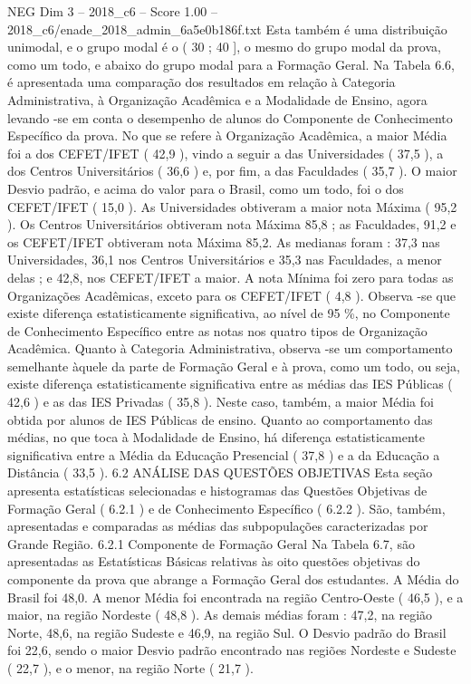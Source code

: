 \begin{textsample}{NEG Dim 3 – 2018\_c6 – Score 1.00 – 2018\_c6/enade\_2018\_admin\_6a5e0b186f.txt}
Esta também é uma distribuição unimodal, e o grupo modal é o ( 30 ; 40 ], o mesmo do grupo modal da prova, como um todo, e abaixo do grupo modal para a Formação Geral.
Na Tabela 6.6, é apresentada uma comparação dos resultados em relação à Categoria Administrativa, à Organização Acadêmica e a Modalidade de Ensino, agora levando -se em conta o desempenho de alunos do Componente de Conhecimento Específico da prova.
No que se refere à Organização Acadêmica, a maior Média foi a dos CEFET/IFET ( 42,9 ), vindo a seguir a das Universidades ( 37,5 ), a dos Centros Universitários ( 36,6 ) e, por fim, a das Faculdades ( 35,7 ).
O maior Desvio padrão, e acima do valor para o Brasil, como um todo, foi o dos CEFET/IFET ( 15,0 ).
As Universidades obtiveram a maior nota Máxima ( 95,2 ).
Os Centros Universitários obtiveram nota Máxima 85,8 ; as Faculdades, 91,2 e os CEFET/IFET obtiveram nota Máxima 85,2.
As medianas foram : 37,3 nas Universidades, 36,1 nos Centros Universitários e 35,3 nas Faculdades, a menor delas ; e 42,8, nos CEFET/IFET a maior.
A nota Mínima foi zero para todas as Organizações Acadêmicas, exceto para os CEFET/IFET ( 4,8 ).
Observa -se que existe diferença estatisticamente significativa, ao nível de 95 \%, no Componente de Conhecimento Específico entre as notas nos quatro tipos de Organização Acadêmica.
Quanto à Categoria Administrativa, observa -se um comportamento semelhante àquele da parte de Formação Geral e à prova, como um todo, ou seja, existe diferença estatisticamente significativa entre as médias das IES Públicas ( 42,6 ) e as das IES Privadas ( 35,8 ).
Neste caso, também, a maior Média foi obtida por alunos de IES Públicas de ensino.
Quanto ao comportamento das médias, no que toca à Modalidade de Ensino, há diferença estatisticamente significativa entre a Média da Educação Presencial ( 37,8 ) e a da Educação a Distância ( 33,5 ). 6.2 ANÁLISE DAS QUESTÕES OBJETIVAS Esta seção apresenta estatísticas selecionadas e histogramas das Questões Objetivas de Formação Geral ( 6.2.1 ) e de Conhecimento Específico ( 6.2.2 ).
São, também, apresentadas e comparadas as médias das subpopulações caracterizadas por Grande Região. 6.2.1 Componente de Formação Geral Na Tabela 6.7, são apresentadas as Estatísticas Básicas relativas às oito questões objetivas do componente da prova que abrange a Formação Geral dos estudantes.
A Média do Brasil foi 48,0.
A menor Média foi encontrada na região Centro-Oeste ( 46,5 ), e a maior, na região Nordeste ( 48,8 ).
As demais médias foram : 47,2, na região Norte, 48,6, na região Sudeste e 46,9, na região Sul.
O Desvio padrão do Brasil foi 22,6, sendo o maior Desvio padrão encontrado nas regiões Nordeste e Sudeste ( 22,7 ), e o menor, na região Norte ( 21,7 ).

\end{textsample}
